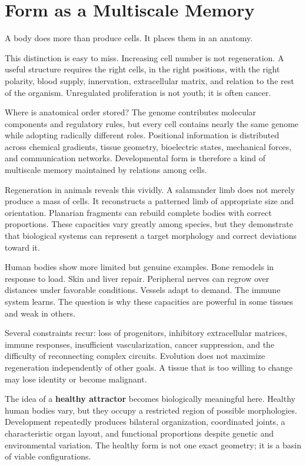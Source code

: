 \chapter{Form as a Multiscale Memory}\label{chapter-6-form-as-a-multiscale-memory}

A body does more than produce cells. It places them in an anatomy.

This distinction is easy to miss. Increasing cell number is not regeneration. A useful structure requires the right cells, in the right positions, with the right polarity, blood supply, innervation, extracellular matrix, and relation to the rest of the organism. Unregulated proliferation is not youth; it is often cancer.

Where is anatomical order stored? The genome contributes molecular components and regulatory rules, but every cell contains nearly the same genome while adopting radically different roles. Positional information is distributed across chemical gradients, tissue geometry, bioelectric states, mechanical forces, and communication networks. Developmental form is therefore a kind of multiscale memory maintained by relations among cells.

Regeneration in animals reveals this vividly. A salamander limb does not merely produce a mass of cells. It reconstructs a patterned limb of appropriate size and orientation. Planarian fragments can rebuild complete bodies with correct proportions. These capacities vary greatly among species, but they demonstrate that biological systems can represent a target morphology and correct deviations toward it.

Human bodies show more limited but genuine examples. Bone remodels in response to load. Skin and liver repair. Peripheral nerves can regrow over distances under favorable conditions. Vessels adapt to demand. The immune system learns. The question is why these capacities are powerful in some tissues and weak in others.

Several constraints recur: loss of progenitors, inhibitory extracellular matrices, immune responses, insufficient vascularization, cancer suppression, and the difficulty of reconnecting complex circuits. Evolution does not maximize regeneration independently of other goals. A tissue that is too willing to change may lose identity or become malignant.

The idea of a \textbf{healthy attractor} becomes biologically meaningful here. Healthy human bodies vary, but they occupy a restricted region of possible morphologies. Development repeatedly produces bilateral organization, coordinated joints, a characteristic organ layout, and functional proportions despite genetic and environmental variation. The healthy form is not one exact geometry; it is a basin of viable configurations.

